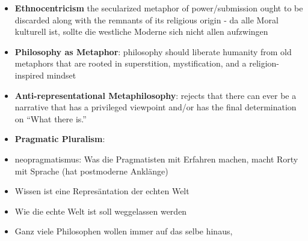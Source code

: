 \documentclass[emulatestandardclasses]{scrartcl}
\begin{document}
\begin{itemize}
  \item \textbf{Ethnocentricism} the secularized metaphor of power/submission ought to be discarded along with the remnants of its religious origin - da alle Moral kulturell ist, sollte die westliche Moderne sich nicht allen aufzwingen
  \item \textbf{Philosophy as Metaphor}: philosophy should liberate humanity from old metaphors that are rooted in superstition, mystification, and a religion-inspired mindset
  \item \textbf{Anti-representational Metaphilosophy}: rejects that there can ever be a narrative that has a privileged viewpoint and/or has the final determination on “What there is.”
  \item \textbf{Pragmatic Pluralism}: 
\end{itemize}

\begin{itemize}
  \item neopragmatismus: Was die Pragmatisten mit Erfahren machen, macht Rorty mit Sprache (hat postmoderne Anklänge)
  \item Wissen ist eine Represäntation der echten Welt
  \item Wie die echte Welt ist soll weggelassen werden
  \item Ganz viele Philosophen wollen immer auf das selbe hinaus, 
\end{itemize}



\newpage
%


\end{document}
